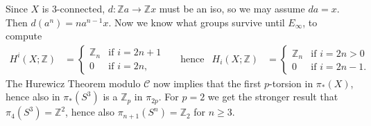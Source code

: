 \documentclass{article}
\newcommand{\mb}[1]{\mathbb{#1}}
\newcommand{\mc}[1]{\mathcal{#1}}
\newcommand{\Z}{\mb{Z}}
\theoremstyle{definition}
\theoremstyle{remark}
\begin{document}
Since $X$ is 3-connected, $d:\Z a \to \Z x$ must be an iso, so we may assume $da=x$. Then $d(a^n)=na^{n-1}x$. Now we know what groups survive until $E_\infty$, to compute
\begin{align*}
H^i(X;\Z)&=\begin{cases} \Z_n & \text{if $i=2n+1$} \\ 0 & \text{if $i=2n$,} \end{cases} && \text{hence}&
H_i(X;\Z)&=\begin{cases} \Z_n & \text{if $i=2n>0$} \\ 0 & \text{if $i=2n-1$.} \end{cases}
\end{align*}
The Hurewicz Theorem modulo $\mc C$ now implies that the first $p$-torsion in $\pi_*(X)$, hence also in $\pi_*(S^3)$ is a $\Z_p$ in $\pi_{2p}$. For $p=2$ we get the stronger result that $\pi_4(S^3)=\Z^2$, hence also $\pi_{n+1}(S^n)=\Z_2$ for $n\geq3$.
\end{document}
